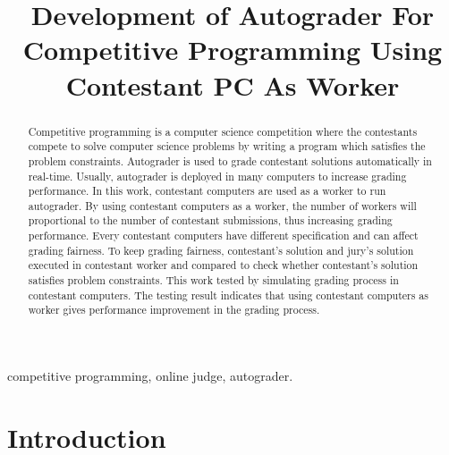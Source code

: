 \documentclass[conference]{IEEEtran}
\begin{document}
\title{Development of Autograder For Competitive Programming Using Contestant PC As Worker}

\author{
    \and
}

\maketitle

\begin{abstract}
Competitive programming is a computer science competition where the contestants compete to solve computer science problems by writing a program which satisfies the problem constraints. Autograder is used to grade contestant solutions automatically in real-time. Usually, autograder is deployed in many computers to increase grading performance. In this work, contestant computers are used as a worker to run autograder. By using contestant computers as a worker, the number of workers will proportional to the number of contestant submissions, thus increasing grading performance. Every contestant computers have different specification and can affect grading fairness. To keep grading fairness, contestant's solution and jury's solution executed in contestant worker and compared to check whether contestant's solution satisfies problem constraints. This work tested by simulating grading process in contestant computers. The testing result indicates that using contestant computers as worker gives performance improvement in the grading process.
\end{abstract}

\begin{IEEEkeywords}
competitive programming, online judge, autograder.
\end{IEEEkeywords}

\section{Introduction}
\end{document}

